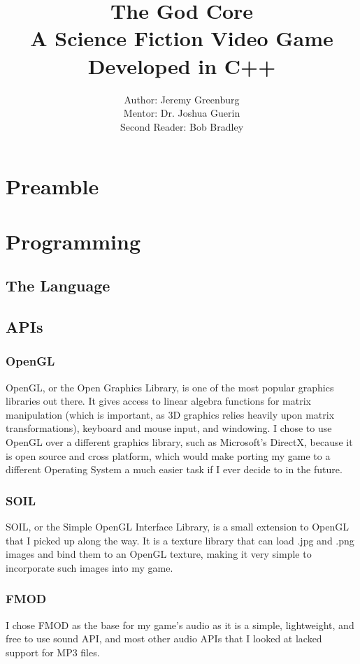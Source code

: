 \documentclass{article}
\author{Author: Jeremy Greenburg \\ Mentor: Dr. Joshua Guerin \\ Second Reader: Bob Bradley}
\title{The God Core \\ A Science Fiction Video Game Developed in C++}
\begin{document}
\maketitle
\pagebreak

\tableofcontents

\pagebreak

\section{Preamble}

\section{Programming}

\subsection{The Language}

\subsection{APIs}

\subsubsection{OpenGL}
OpenGL, or the Open Graphics Library, is one of the most popular graphics libraries out there. It gives access to linear algebra functions for matrix manipulation (which is important, as 3D graphics relies heavily upon matrix transformations), keyboard and mouse input, and windowing. I chose to use OpenGL over a different graphics library, such as Microsoft's DirectX, because it is open source and cross platform, which would make porting my game to a different Operating System a much easier task if I ever decide to in the future.

\subsubsection{SOIL}
SOIL, or the Simple OpenGL Interface Library, is a small extension to OpenGL that I picked up along the way. It is a texture library that can load .jpg and .png images and bind them to an OpenGL texture, making it very simple to incorporate such images into my game.

\subsubsection{FMOD}
I chose FMOD as the base for my game's audio as it is a simple, lightweight, and free to use sound API, and most other audio APIs that I looked at lacked support for MP3 files. 
\end{document}
